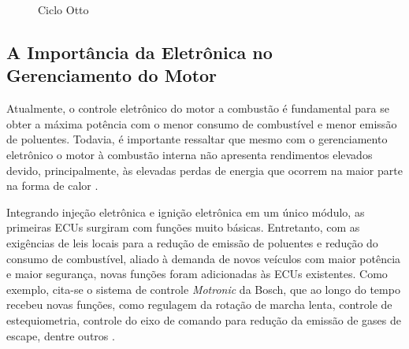 \begin{figure}[H]
	\centering
		\caption{Ciclo Otto}
		\setlength\fboxsep{1.1pt}
		\setlength\fboxrule{0.3pt}
	\label{fig:otto}
\end{figure}

\subsection{A Importância da Eletrônica no Gerenciamento do Motor}

	Atualmente, o controle eletrônico do motor a combustão é fundamental para se obter a máxima potência com o menor consumo de combustível e menor emissão de poluentes. Todavia, é importante ressaltar que mesmo com o gerenciamento eletrônico o motor à combustão interna não apresenta rendimentos elevados devido, principalmente, às elevadas perdas de energia que ocorrem na maior parte na forma de calor \cite{manavella}.
	
	Integrando injeção eletrônica e ignição eletrônica em um único módulo, as primeiras ECUs surgiram com funções muito básicas. Entretanto, com as exigências de leis locais para a redução de emissão de poluentes e redução do consumo de combustível, aliado à demanda de novos veículos com maior potência e maior segurança, novas funções foram adicionadas às ECUs existentes. Como exemplo, cita-se o sistema de controle \textit{Motronic} da Bosch, que ao longo do tempo recebeu novas funções, como regulagem da rotação de marcha lenta, controle de estequiometria, controle do eixo de comando para redução da emissão de gases de escape, dentre outros \cite{bosch2005manual}.
	
